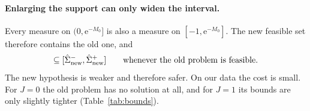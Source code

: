 \documentclass[11pt]{article}
\newcommand{\ee}{\mathrm{e}}
\theoremstyle{remark}
\begin{document}
\paragraph{Enlarging the support can only widen the interval.} Every measure on $(0,\ee^{-M_0}]$ is also a measure on $[-1,\ee^{-M_0}]$. The new feasible set therefore
contains the old one, and
\begin{equation}
 [\hat\Sigma^-_{\rm old},\hat\Sigma^+_{\rm old}]\subseteq[\hat\Sigma^-_{\rm new},\hat\Sigma^+_{\rm new}]\qquad\text{whenever the old problem is feasible.}
\end{equation}
The new hypothesis is weaker and therefore safer. On our data the cost is small. For $J=0$ the old problem has no solution at all, and for $J=1$ its bounds are only slightly tighter (Table~\ref{tab:bounds}).
\end{document}
